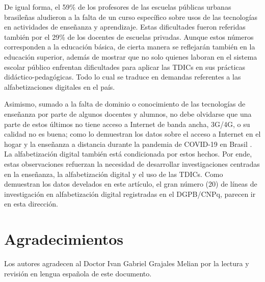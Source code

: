 \documentclass{textolivre}
\begin{document}
De igual forma, el 59\% de los profesores de las escuelas públicas urbanas brasileñas aludieron a la falta de un curso específico sobre usos de las tecnologías en actividades de enseñanza y aprendizaje. Estas dificultades fueron referidas también por el 29\% de los docentes de escuelas privadas. Aunque estos números corresponden a la educación básica, de cierta manera se reflejarán también en la educación superior, además de mostrar que no solo quienes laboran en el sistema escolar público enfrentan dificultades para aplicar las TDICs en sus prácticas didáctico-pedagógicas. Todo lo cual se traduce en demandas referentes a las alfabetizaciones digitales en el país.  

Asimismo, sumado a la falta de dominio o conocimiento de las tecnologías de enseñanza por parte de algunos docentes y alumnos, no debe olvidarse que una parte de estos últimos no tiene acceso a Internet de banda ancha, 3G/4G, o su calidad no es buena; como lo demuestran los datos sobre el acceso a Internet en el hogar y la enseñanza a distancia durante la pandemia de COVID-19 en Brasil \cite{nascimento_acesso_2020}. La alfabetización digital también está condicionada por estos hechos. Por ende, estas observaciones refuerzan la necesidad de desarrollar investigaciones centradas en la enseñanza, la alfabetización digital y el uso de las TDICs. Como demuestran los datos develados en este artículo, el gran número (20) de líneas de investigación en alfabetización digital registradas en el DGPB/CNPq, parecen ir en esta dirección.

\section{Agradecimientos}\label{sec-agradecimentos}
Los autores agradecen al Doctor Ivan Gabriel Grajales Melian por la lectura y revisión en lengua española de este documento.

\printbibliography\label{sec-bib}
\end{document}
